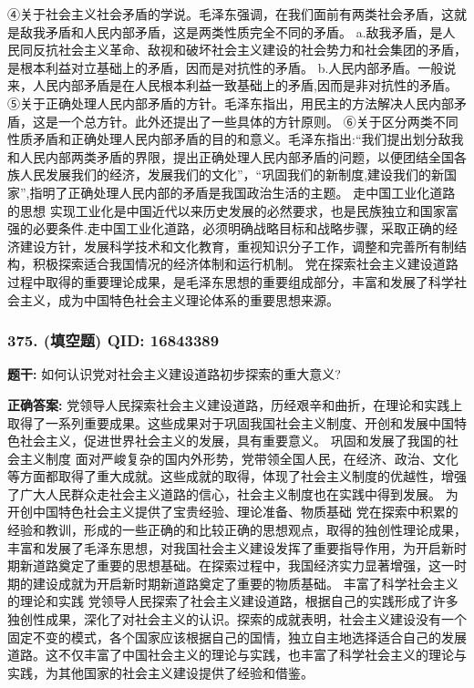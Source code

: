 \documentclass[12pt,UTF8]{ctexart}
\begin{document}
④关于社会主义社会矛盾的学说。毛泽东强调，在我们面前有两类社会矛盾，这就是敌我矛盾和人民内部矛盾，这是两类性质完全不同的矛盾。
a.敌我矛盾，是人民同反抗社会主义革命、敌视和破坏社会主义建设的社会势力和社会集团的矛盾，是根本利益对立基础上的矛盾，因而是对抗性的矛盾。
b.人民内部矛盾。一般说来，人民内部矛盾是在人民根本利益一致基础上的矛盾,因而是非对抗性的矛盾。
⑤关于正确处理人民内部矛盾的方针。毛泽东指出，用民主的方法解决人民内部矛盾，这是一个总方针。此外还提出了一些具体的方针原则。
⑥关于区分两类不同性质矛盾和正确处理人民内部矛盾的目的和意义。毛泽东指出:“我们提出划分敌我和人民内部两类矛盾的界限，提出正确处理人民内部矛盾的问题，以便团结全国各族人民发展我们的经济，发展我们的文化”，“巩固我们的新制度,建设我们的新国家”,指明了正确处理人民内部的矛盾是我国政治生活的主题。
走中国工业化道路的思想
实现工业化是中国近代以来历史发展的必然要求，也是民族独立和国家富强的必要条件.走中国工业化道路，必须明确战略目标和战略步骤，采取正确的经济建设方针，发展科学技术和文化教育，重视知识分子工作，调整和完善所有制结构，积极探索适合我国情况的经济体制和运行机制。
党在探索社会主义建设道路过程中取得的重要理论成果，是毛泽东思想的重要组成部分，丰富和发展了科学社会主义，成为中国特色社会主义理论体系的重要思想来源。

\vspace{0.3em}\hrulefill\vspace{0.7em}

\subsubsection*{375. (填空题) \small QID: 16843389}

\textbf{题干:}
如何认识党对社会主义建设道路初步探索的重大意义?

\textbf{正确答案:}
党领导人民探索社会主义建设道路，历经艰辛和曲折，在理论和实践上取得了一系列重要成果。这些成果对于巩固我国社会主义制度、开创和发展中国特色社会主义，促进世界社会主义的发展，具有重要意义。
巩固和发展了我国的社会主义制度
面对严峻复杂的国内外形势，党带领全国人民，在经济、政治、文化等方面都取得了重大成就。这些成就的取得，体现了社会主义制度的优越性，增强了广大人民群众走社会主义道路的信心，社会主义制度也在实践中得到发展。
为开创中国特色社会主义提供了宝贵经验、理论准备、物质基础
党在探索中积累的经验和教训，形成的一些正确的和比较正确的思想观点，取得的独创性理论成果，丰富和发展了毛泽东思想，对我国社会主义建设发挥了重要指导作用，为开启新时期新道路奠定了重要的思想基础。在探索过程中，我国经济实力显著增强，这一时期的建设成就为开启新时期新道路奠定了重要的物质基础。
丰富了科学社会主义的理论和实践
党领导人民探索了社会主义建设道路，根据自己的实践形成了许多独创性成果，深化了对社会主义的认识。探索的成就表明，社会主义建设没有一个固定不变的模式，各个国家应该根据自己的国情，独立自主地选择适合自己的发展道路。这不仅丰富了中国社会主义的理论与实践，也丰富了科学社会主义的理论与实践，为其他国家的社会主义建设提供了经验和借鉴。
\end{document}

